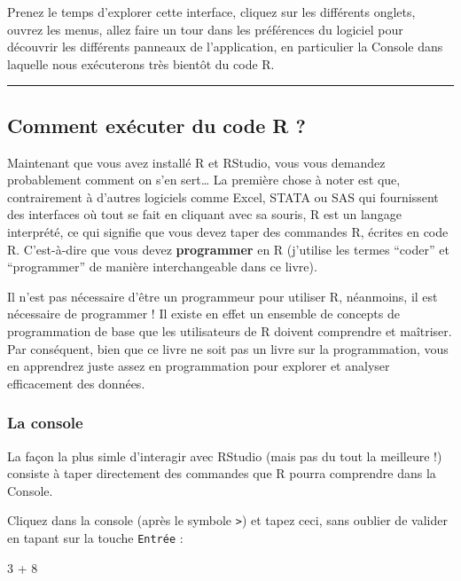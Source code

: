 \documentclass[
  a4paper,
]{article}
\newenvironment{Shaded}{\begin{snugshade}}{\end{snugshade}}
\newcommand{\DecValTok}[1]{\textcolor[rgb]{0.69,0.50,0.00}{#1}}
\newcommand{\OperatorTok}[1]{\textcolor[rgb]{0.12,0.11,0.11}{#1}}
\newcommand{\StringTok}[1]{\textcolor[rgb]{0.75,0.01,0.01}{#1}}
\begin{document}
Prenez le temps d'explorer cette interface, cliquez sur les différents onglets, ouvrez les menus, allez faire un tour dans les préférences du logiciel pour découvrir les différents panneaux de l'application, en particulier la Console dans laquelle nous exécuterons très bientôt du code R.

\begin{center}\rule{0.5\linewidth}{0.5pt}\end{center}

\hypertarget{code}{%
\subsection{Comment exécuter du code R ?}\label{code}}

Maintenant que vous avez installé R et RStudio, vous vous demandez probablement comment on s'en sert\ldots{} La première chose à noter est que, contrairement à d'autres logiciels comme Excel, STATA ou SAS qui fournissent des interfaces où tout se fait en cliquant avec sa souris, R est un langage interprété, ce qui signifie que vous devez taper des commandes R, écrites en code R. C'est-à-dire que vous devez \textbf{programmer} en R (j'utilise les termes ``coder'' et ``programmer'' de manière interchangeable dans ce livre).

Il n'est pas nécessaire d'être un programmeur pour utiliser R, néanmoins, il est nécessaire de programmer ! Il existe en effet un ensemble de concepts de programmation de base que les utilisateurs de R doivent comprendre et maîtriser. Par conséquent, bien que ce livre ne soit pas un livre sur la programmation, vous en apprendrez juste assez en programmation pour explorer et analyser efficacement des données.

\hypertarget{la-console}{%
\subsubsection{La console}\label{la-console}}

La façon la plus simle d'interagir avec RStudio (mais pas du tout la meilleure !) consiste à taper directement des commandes que R pourra comprendre dans la Console.

Cliquez dans la console (après le symbole \texttt{\textgreater{}}) et tapez ceci, sans oublier de valider en tapant sur la touche \texttt{Entrée} :

\begin{Shaded}
\begin{Highlighting}[]
\DecValTok{3} \OperatorTok{+}\StringTok{ }\DecValTok{8}
\end{Highlighting}
\end{Shaded}
\end{document}
